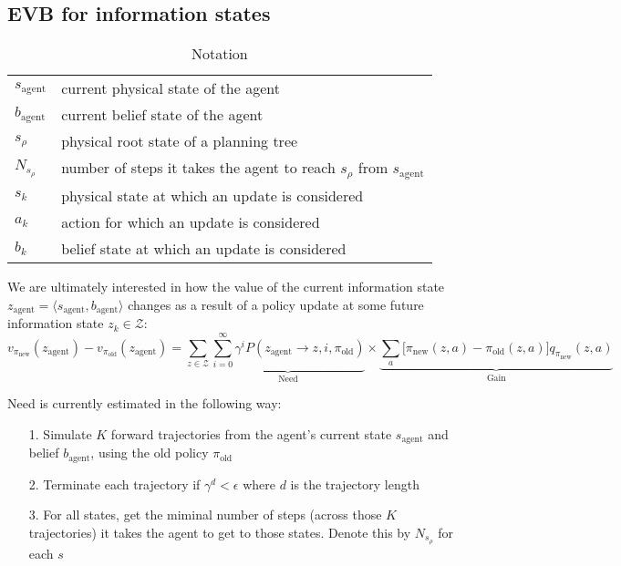 \documentclass{article}
\newcommand{\old}{\text{old}}
\newcommand{\new}{\text{new}}
\begin{document}
\subsection*{EVB for information states}

\begin{table}
\begin{tabular*}{4cm}{ll}
    $s_{\text{agent}}$ & current physical state of the agent\\
    $b_{\text{agent}}$ & current belief state of the agent\\
    $s_\rho$ & physical root state of a planning tree\\
    $N_{s_\rho}$ & number of steps it takes the agent to reach $s_\rho$ from $s_{\text{agent}}$\\
    $s_k$ & physical state at which an update is considered\\
    $a_k$ & action for which an update is considered\\
    $b_k$ & belief state at which an update is considered
\end{tabular*}
\caption{Notation}
\end{table}

\bigbreak

We are ultimately interested in how the value of the current information state $z_{\text{agent}} = \langle s_{\text{agent}}, b_{\text{agent}} \rangle$ changes as a result of 
a policy update at some future information state $z_k \in \mathcal{Z}$:
\begin{equation*}
    \label{eqn:evb}
    v_{\pi_{\text{new}}}(z_{\text{agent}}) - v_{\pi_{\text{old}}}(z_{\text{agent}}) = \sum_{z \in \mathcal{Z}} \underbrace{\sum_{i=0}^{\infty} \gamma^i P(z_{\text{agent}} \rightarrow z, i, \pi_{\old})}_{\text{Need}} \times \underbrace{\sum_a \big[ \pi_{\new}(z, a) - \pi_{\old}(z, a) \big] q_{\pi_{\new}}(z, a)}_{\text{Gain}}
\end{equation*}

\bigbreak

Need is currently estimated in the following way:
\begin{itemize}
    \item[1.] Simulate $K$ forward trajectories from the agent's current state $s_{\text{agent}}$ and belief $b_{\text{agent}}$, using the old policy $\pi_{\text{old}}$
    \item[2.] Terminate each trajectory if $\gamma^{d} < \epsilon$ where $d$ is the trajectory length 
    \item[3.] For all states, get the miminal number of steps (across those $K$ trajectories) it takes the agent to get to those states. Denote this by $N_{s_\rho}$ for each $s$
\end{itemize}
\end{document}
